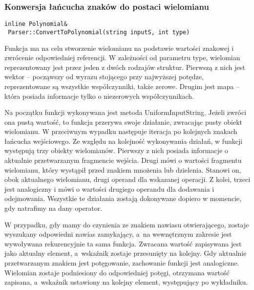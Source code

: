 \subsubsection{Konwersja łańcucha znaków do postaci wielomianu}
\begin{lstlisting}
inline Polynomial&
 Parser::ConvertToPolynomial(string inputS, int type)
\end{lstlisting}

Funkcja ma na celu stworzenie wielomianu na podstawie wartości znakowej i zwrócenie odpowiedniej referencji. W zależności od parametru type, wielomian reprezentowany jest przez jeden z dwóch rodzajów struktur. Pierwszą z nich jest wektor -- począwszy od wyrazu stojącego przy najwyższej potędze, reprezentowane są wszystkie współczynniki, także zerowe. Drugim jest mapa -- która posiada informacje tylko o niezerowych współczynnikach.

Na początku funkcji wykonywana jest metoda UniformInputString. Jeżeli zwróci ona pustą wartość, to funkcja przerywa swoje działanie, zwracając pusty obiekt wielomianu. W przeciwnym wypadku następuje iteracja po kolejnych znakach łańcucha wejściowego. Ze względu na kolejność wykonywania działań, w funkcji występują trzy obiekty wielomianów. Pierwszy z nich posiada informacje o aktualnie przetwarzanym fragmencie wejścia. Drugi mówi o wartości fragmentu wielomianu, który wystąpił przed znakiem mnożenia lub dzielenia. Stanowi on, obok aktualnego wielomianu, drugi operand dla wskazanej operacji. Z kolei, trzeci jest analogiczny i mówi o wartości drugiego operandu dla dodawania i odejmowania. Wszystkie te działania zostają dokonywane dopiero w momencie, gdy natrafimy na dany operator.

W przypadku, gdy mamy do czynienia ze znakiem nawiasu otwierającego, zostaje wyszukany odpowiedni nawias zamykający, a~na wewnętrznym zakresie jest wywoływana rekurencyjnie ta sama funkcja. Zwracana wartość zapisywana jest jako aktualny element, a~wskaźnik zostaje przesunięty na kolejny. Gdy aktualnie przetwarzanym znakiem jest potęgowanie, zachowanie funkcji jest analogiczne. Wielomian zostaje podniesiony do odpowiedniej potęgi, otrzymana wartość zapisana, a~wskaźnik ustawiony na kolejny element, występujący po wykładniku.

